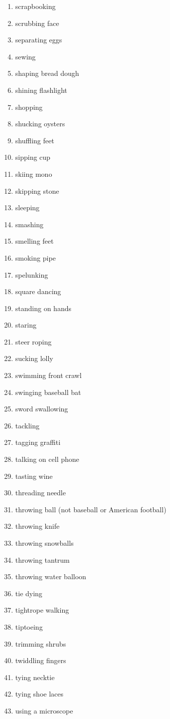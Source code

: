 \documentclass[10pt,twocolumn,letterpaper]{article}
\begin{document}
\begin{enumerate}
\item scrapbooking
\item scrubbing face
\item separating eggs
\item sewing
\item shaping bread dough
\item shining flashlight
\item shopping
\item shucking oysters
\item shuffling feet
\item sipping cup
\item skiing mono
\item skipping stone
\item sleeping
\item smashing
\item smelling feet
\item smoking pipe
\item spelunking
\item square dancing
\item standing on hands
\item staring
\item steer roping
\item sucking lolly
\item swimming front crawl
\item swinging baseball bat
\item sword swallowing
\item tackling
\item tagging graffiti
\item talking on cell phone
\item tasting wine
\item threading needle
\item throwing ball (not baseball or American football)
\item throwing knife
\item throwing snowballs
\item throwing tantrum
\item throwing water balloon
\item tie dying
\item tightrope walking
\item tiptoeing
\item trimming shrubs
\item twiddling fingers
\item tying necktie
\item tying shoe laces
\item using a microscope

\end{enumerate}
\end{document}
